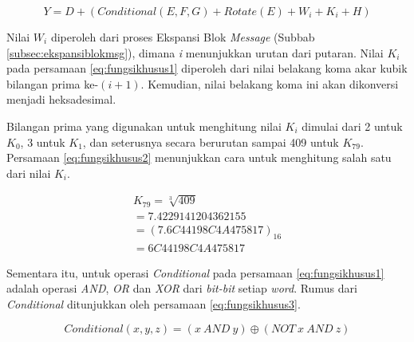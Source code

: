 \begin{equation}
	Y = D + (Conditional(E,F,G) + Rotate(E) + W_i + K_i + H) \label{eq:fungsikhusus1}
\end{equation}

Nilai \begin{math}W_i\end{math} diperoleh dari proses Ekspansi Blok \textit{Message} (Subbab \ref{subsec:ekspansiblokmsg}), dimana \textit{i} menunjukkan urutan dari putaran. Nilai \begin{math}K_i\end{math} pada persamaan \ref{eq:fungsikhusus1} diperoleh dari nilai belakang koma akar kubik bilangan prima ke-\begin{math}(i+1)\end{math}. Kemudian, nilai belakang koma ini akan dikonversi menjadi heksadesimal. 

Bilangan prima yang digunakan untuk menghitung nilai \begin{math}K_i\end{math} dimulai dari 2 untuk \begin{math}K_0\end{math}, 3 untuk \begin{math}K_1\end{math}, dan seterusnya secara berurutan sampai 409 untuk \begin{math}K_{79}\end{math}. Persamaan \ref{eq:fungsikhusus2} menunjukkan cara untuk menghitung salah satu dari nilai \begin{math}K_i\end{math}.

\begin{gather}
	K_{79} = \sqrt[3]{409} \nonumber \\
	= 7.4229141204362155 \nonumber \\
	= (7.6C44198C4A475817)_{16} \label{eq:fungsikhusus2} \\
	= 6C44198C4A475817 \nonumber
\end{gather}

Sementara itu, untuk operasi \textit{Conditional} pada persamaan \ref{eq:fungsikhusus1} adalah operasi \textit{AND}, \textit{OR} dan \textit{XOR} dari \textit{bit-bit} setiap \textit{word}. Rumus dari \textit{Conditional} ditunjukkan oleh persamaan \ref{eq:fungsikhusus3}.

\begin{equation}
	Conditional(x,y,z) = (x\: AND\: y) \oplus (NOT\: x\: AND\: z) \label{eq:fungsikhusus3}
\end{equation}

